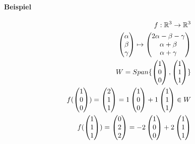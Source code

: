\paragraph{Beispiel}
\begin{align}
f: \mathbb{R}^3 \rightarrow \mathbb{R}^3 \\
\begin{pmatrix} \alpha \\ \beta \\ \gamma\end{pmatrix} \mapsto \begin{pmatrix} 2\alpha - \beta - \gamma \\ \alpha + \beta \\ \alpha + \gamma \end{pmatrix} \\
W = Span\{\begin{pmatrix} 1 \\ 0 \\ 0\end{pmatrix}, \begin{pmatrix} 1 \\ 1 \\ 1\end{pmatrix}\} \\
f(\begin{pmatrix} 1 \\ 0 \\ 0\end{pmatrix}) = \begin{pmatrix} 2 \\ 1 \\ 1\end{pmatrix} = 1 \begin{pmatrix} 1 \\ 0 \\ 0\end{pmatrix} + 1 \begin{pmatrix} 1 \\ 1 \\ 1 \end{pmatrix} \in W \\
f(\begin{pmatrix} 1 \\ 1 \\ 1\end{pmatrix}) = \begin{pmatrix} 0 \\ 2 \\ 2\end{pmatrix} = -2 \begin{pmatrix} 1 \\ 0 \\ 0\end{pmatrix} + 2 \begin{pmatrix} 1 \\ 1 \\ 1 \end{pmatrix}
\end{align}
